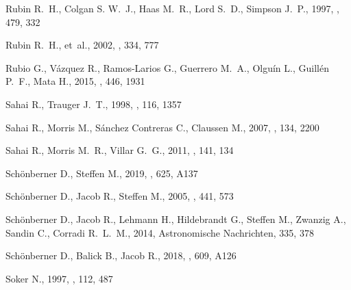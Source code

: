 \documentclass[useAMS, usenatbib]{mnras}
\begin{document}
\begin{thebibliography}{}
{Rubin} R.~H.,  {Colgan} S. W.~J.,  {Haas} M.~R.,  {Lord} S.~D.,   {Simpson}
  J.~P.,  1997, \apj, 479, 332

{Rubin} R.~H.,  et~al., 2002, \mnras, 334, 777

{Rubio} G.,  {Vázquez} R.,  {Ramos-Larios} G.,  {Guerrero} M.~A.,  {Olguín}
  L.,  {Guillén} P.~F.,   {Mata} H.,  2015, \mnras, 446, 1931

{Sahai} R.,  {Trauger} J.~T.,  1998, \aj, 116, 1357

{Sahai} R.,  {Morris} M.,  {Sánchez Contreras} C.,   {Claussen} M.,  2007,
  \aj, 134, 2200

{Sahai} R.,  {Morris} M.~R.,   {Villar} G.~G.,  2011, \aj, 141, 134

{Schönberner} D.,  {Steffen} M.,  2019, \aap, 625, A137

{Schönberner} D.,  {Jacob} R.,   {Steffen} M.,  2005, \aap, 441, 573

{Schönberner} D.,  {Jacob} R.,  {Lehmann} H.,  {Hildebrandt} G.,  {Steffen}
  M.,  {Zwanzig} A.,  {Sandin} C.,   {Corradi} R.~L.~M.,  2014, Astronomische
  Nachrichten, 335, 378

{Schönberner} D.,  {Balick} B.,   {Jacob} R.,  2018, \aap, 609, A126

{Soker} N.,  1997, \apjs, 112, 487


\end{thebibliography}
\end{document}
